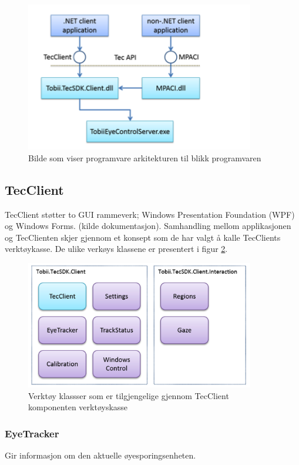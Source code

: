 \documentclass[phd,tocprelim]{cornell}
\begin{document}
\begin{figure}[ht!]
\centering
\includegraphics[width=100mm]{SoftwareArchitectureOverview}
\caption{Bilde som viser programvare arkitekturen til blikk programvaren}
\label{fig:overview}
\end{figure}


\subsection{TecClient}

TecClient støtter to GUI rammeverk; Windows Presentation Foundation (\gls{WPF}) og Windows Forms. 
 (kilde dokumentasjon).  Samhandling mellom applikasjonen og TecClienten skjer gjennom et konsept som de har valgt å kalle TecClients verktøykasse. De ulike verkøys klassene er presentert i figur \ref{fig:toolbox}. 

\begin{figure}[ht!]
\centering
\includegraphics[width=100mm]{Toolbox}
\caption{Verktøy klassser som er tilgjengelige gjennom TecClient komponenten verktøyskasse}
\label{fig:toolbox}
\end{figure}


\subsubsection{EyeTracker}
Gir informasjon om den aktuelle øyesporingsenheten.
\end{document}
